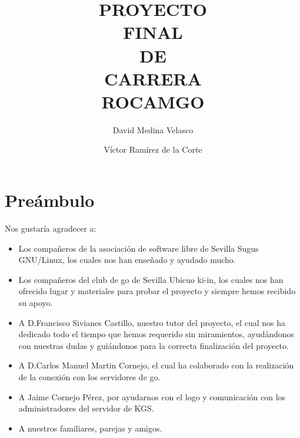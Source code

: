 \documentclass[12pt,a4paper]{report}
\begin{document}

\title{PROYECTO\\ FINAL\\ DE \\CARRERA \\ ROCAMGO\\}
\author{David Medina Velasco \and Víctor Ramírez de la Corte}
\maketitle

\marginsize{3cm}{2cm}{2cm}{2cm} %
\tableofcontents  %

 
\chapter*{Preámbulo} 

Nos gustaría agradecer a: 
\begin{itemize} 
    \item Los compañeros de la asociación de software libre de Sevilla Sugus 
    GNU/Linux, los cuales nos han enseñado y ayudado mucho.  
    \item Los compañeros del club de go de Sevilla Ubicuo ki-in, los cuales nos
    han ofrecido lugar y materiales para probar el proyecto y siempre hemos 
    recibido su apoyo.  
    \item A D.Francisco Sivianes Castillo, nuestro tutor del proyecto, el cual 
    nos ha dedicado todo el tiempo que hemos requerido sin miramientos, 
    ayudándonos con nuestras dudas y guiándonos para la correcta finalización 
    del proyecto.  
    \item A D.Carlos Manuel Martin Cornejo, el cual ha colaborado con la 
    realización de la conexión con los servidores de go.  
    \item A Jaime Cornejo Pérez, por ayudarnos con el logo y comunicación con 
    los administradores del servidor de KGS.  
    \item A nuestros familiares, parejas y amigos.
\end{itemize}
\end{document}
